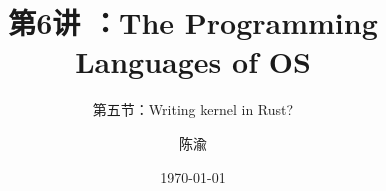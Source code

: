 


\title[第6讲]{第6讲 ：The Programming Languages of OS} %
\subtitle{第五节：Writing kernel in Rust?}
\author{陈渝} %
\date{\today} %




\begin{frame}
\titlepage %
\end{frame}

%
%


